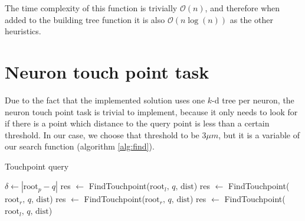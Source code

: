 The time complexity of this function is trivially $\mathcal{O}(n)$, and therefore when added to the building tree function it is also $\mathcal{O}(n\log{}(n))$ as the other heuristics.
\pagebreak

\section{Neuron touch point task}
Due to the fact that the implemented solution uses one $k$-d tree per neuron, the neuron touch point task is trivial to implement, because it only needs to look for if there is a point which distance to the query point is less than a certain threshold. In our case, we choose that threshold to be $3 \mu m$, but it is a variable of our search function (algorithm \ref{alg:find}).
\begin{algorithm}[h!]
    \caption{Touchpoint query
        \label{alg:find}}
    \begin{algorithmic}[1]
    \Statex
            \State {}
        \EndIf
        \State $\delta \gets |\text{root}_p - q|$
            \State {}
        \Else
                \State res $\gets$ FindTouchpoint($\text{root}_l,\, q,\, \text{dist}$)
                    \State {}
                \EndIf
                    \State res $\gets$ FindTouchpoint($\text{root}_r,\, q,\, \text{dist}$)
                        \State {}
                    \EndIf
                \EndIf
            \Else
                \State res $\gets$ FindTouchpoint($\text{root}_r,\, q,\, \text{dist}$)
                    \State {}
                \EndIf
                    \State res $\gets$ FindTouchpoint($\text{root}_l,\, q,\, \text{dist}$)
                        \State {}
                    \EndIf
                \EndIf
            \EndIf
            \State {}
        \EndIf
    \EndFunction
    \end{algorithmic}
\end{algorithm}


